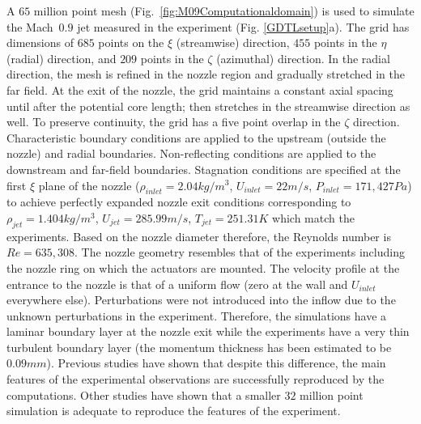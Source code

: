 \documentclass[english]{aiaa-tc}
\begin{document}
 A $65$ million point mesh (Fig.~\ref{fig:M09Computationaldomain}) is
 used to simulate the Mach~$0.9$ jet measured in the experiment (Fig.
 \ref{GDTLsetup}a).  The grid has dimensions of $685$ points on the
 $\xi$ (streamwise) direction, $455$ points in the $\eta$ (radial)
 direction, and $209$ points in the $\zeta$ (azimuthal) direction. In
 the radial direction, the mesh is refined in the nozzle region and
 gradually stretched in the far field. At the exit of the nozzle, the
 grid maintains a constant axial spacing until after the potential
 core length; then stretches in the streamwise direction as well. To
 preserve continuity, the grid has a five point overlap in the $\zeta$
 direction. Characteristic boundary conditions\cite{bj2000-1} are
 applied to the upstream (outside the nozzle) and radial boundaries.
 Non-reflecting conditions are applied to the downstream and far-field
 boundaries. Stagnation conditions are specified at the first $\xi$
 plane of the nozzle ($\rho_{inlet}=2.04kg/m^{3}$, $U_{inlet}=22m/s$, $P_{inlet}=171,427Pa$) to
 achieve perfectly expanded nozzle exit conditions corresponding to
 $\rho_{jet}=1.404kg/m^{3}$, $U_{jet}=285.99m/s$, $T_{jet}=251.31K$ which match the experiments.
 Based on the nozzle diameter therefore, the Reynolds number is
 $Re=635,308$. The nozzle geometry resembles that of the 
 experiments including the nozzle ring on which the actuators are
 mounted. 
The velocity profile at the entrance to the nozzle is that
 of a uniform flow (zero at the wall and $U_{inlet}$ everywhere else).
 Perturbations were not introduced into the inflow due to the
 unknown perturbations in the experiment. Therefore, the simulations
 have a laminar boundary layer at the nozzle exit while the
 experiments have a very thin turbulent boundary layer (the momentum
 thickness has been estimated to be $0.09 mm$).  Previous studies have
 shown that despite this difference, the main features of the
 experimental observations are successfully reproduced by the
 computations\cite{gdv2011-POF,SpethCF2013}.  Other studies have shown
 that a smaller $32$ million point simulation is adequate to reproduce
 the features of the experiment\cite{spethASME2013}.
\end{document}
